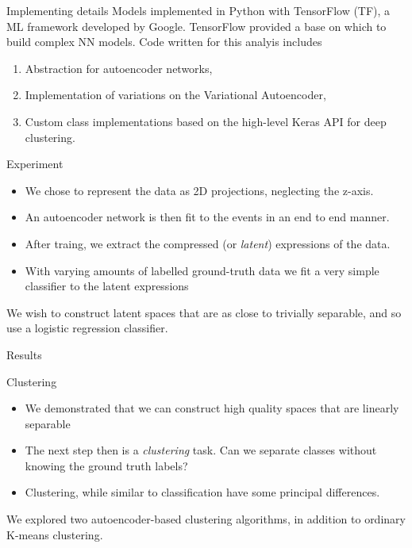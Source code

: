 \documentclass{beamer}
\begin{document}
\begin{frame}[t]{Implementing details}
	Models implemented in Python with TensorFlow (TF), a ML framework developed by Google.
	TensorFlow provided a base on which to build complex NN models.
	Code written for this analyis includes 

	\begin{enumerate}[I]
		\item Abstraction for autoencoder networks,
		\item Implementation of variations on the Variational Autoencoder,
		\item Custom class implementations based on the high-level Keras API for deep clustering.
	\end{enumerate}
\end{frame}

\begin{frame}[t]{Experiment}
	\begin{itemize}
		\item We chose to represent the data as 2D projections, neglecting the z-axis.
		\item An autoencoder network is then fit to the events in an end to end manner.
		\item After traing, we extract the compressed (or \textit{latent}) expressions of the data.
		\item With varying amounts of labelled ground-truth data we fit a very simple classifier to the latent expressions
	\end{itemize}
	We wish to construct latent spaces that are as close to trivially separable, and so use a logistic regression classifier.
\end{frame}

\begin{frame}[t]{Results}
	\begin{figure}[h]
	\end{figure}
	
\end{frame}
\begin{frame}[t]{Clustering}
	\begin{itemize}
		\item We demonstrated that we can construct high quality spaces that are linearly separable
		\item The next step then is a \textit{clustering} task. Can we separate classes without knowing the ground truth labels? 
		\item Clustering, while similar to classification have some principal differences.
	\end{itemize}
	We explored two autoencoder-based clustering algorithms, in addition to ordinary K-means clustering.
\end{frame}
\end{document}

